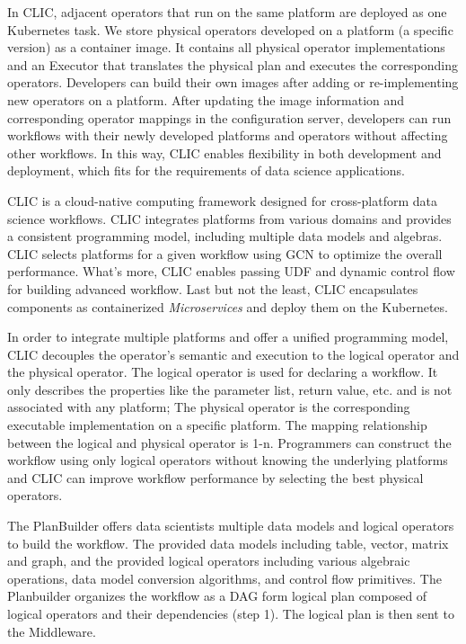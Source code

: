 \iffalse
In CLIC, adjacent operators that run on the same platform are deployed as one Kubernetes task. We store physical operators developed on a platform (a specific version) as a container image. It contains all physical operator implementations and an Executor that translates the physical plan and executes the corresponding operators. Developers can build their own images after adding or re-implementing new operators on a platform. After updating the image information and corresponding operator mappings in the configuration server, developers can run workflows with their newly developed platforms and operators without affecting other workflows. In this way, CLIC enables flexibility in both development and deployment, which fits for the requirements of data science applications.

CLIC is a cloud-native computing framework designed for cross-platform data science workflows. CLIC integrates platforms from various domains and provides a consistent programming model, including multiple data models and algebras. CLIC selects platforms for a given workflow using GCN to optimize the overall performance. What’s more, CLIC enables passing UDF and dynamic control flow for building advanced workflow. Last but not the least, CLIC encapsulates components as containerized \textit{Microservices} and deploy them on the Kubernetes.

In order to integrate multiple platforms and offer a unified programming model, CLIC decouples the operator’s semantic and execution to the logical operator and the physical operator. The logical operator is used for declaring a workflow. It only describes the properties like the parameter list, return value, etc. and is not associated with any platform; The physical operator is the corresponding executable implementation on a specific platform. The mapping relationship between the logical and physical operator is 1-n. Programmers can construct the workflow using only logical operators without knowing the underlying platforms and CLIC can improve workflow performance by selecting the best physical operators.

The PlanBuilder offers data scientists multiple data models and logical operators to build the workflow. The provided data models including table, vector, matrix and graph, and the provided logical operators including various algebraic operations, data model conversion algorithms, and control flow primitives. The Planbuilder organizes the workflow as a DAG form logical plan composed of logical operators and their dependencies (step 1). The logical plan is then sent to the Middleware.

